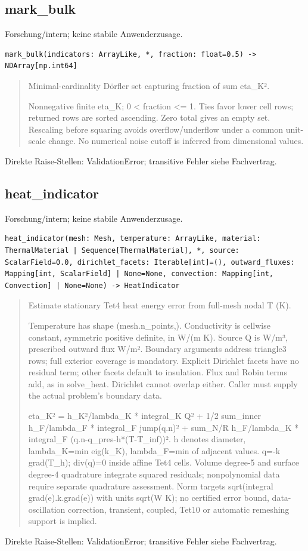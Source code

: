 \subsection{mark\_bulk}
Forschung/intern; keine stabile Anwenderzusage.
\begin{lstlisting}
mark_bulk(indicators: ArrayLike, *, fraction: float=0.5) -> NDArray[np.int64]
\end{lstlisting}
\begin{quote}
Minimal-cardinality Dörfler set capturing fraction of sum eta\_K².\par Nonnegative finite eta\_K; 0 < fraction <= 1. Ties favor lower cell rows; returned rows are sorted ascending. Zero total gives an empty set. Rescaling before squaring avoids overflow/underflow under a common unit-scale change. No numerical noise cutoff is inferred from dimensional values.
\end{quote}
Direkte Raise-Stellen: ValidationError; transitive Fehler siehe Fachvertrag.
\subsection{heat\_indicator}
Forschung/intern; keine stabile Anwenderzusage.
\begin{lstlisting}
heat_indicator(mesh: Mesh, temperature: ArrayLike, material: ThermalMaterial | Sequence[ThermalMaterial], *, source: ScalarField=0.0, dirichlet_facets: Iterable[int]=(), outward_fluxes: Mapping[int, ScalarField] | None=None, convection: Mapping[int, Convection] | None=None) -> HeatIndicator
\end{lstlisting}
\begin{quote}
Estimate stationary Tet4 heat energy error from full-mesh nodal T (K).\par Temperature has shape (mesh.n\_points,). Conductivity is cellwise constant, symmetric positive definite, in W/(m K). Source Q is W/m³, prescribed outward flux W/m². Boundary arguments address triangle3 rows; full exterior coverage is mandatory. Explicit Dirichlet facets have no residual term; other facets default to insulation. Flux and Robin terms add, as in solve\_heat. Dirichlet cannot overlap either. Caller must supply the actual problem's boundary data.\par eta\_K² = h\_K²/lambda\_K * integral\_K Q²   + 1/2 sum\_inner h\_F/lambda\_F * integral\_F jump(q.n)²   + sum\_N/R h\_F/lambda\_K * integral\_F (q.n-q\_pres-h*(T-T\_inf))². h denotes diameter, lambda\_K=min eig(k\_K), lambda\_F=min of adjacent values. q=-k grad(T\_h); div(q)=0 inside affine Tet4 cells. Volume degree-5 and surface degree-4 quadrature integrate squared residuals; nonpolynomial data require separate quadrature assessment. Norm targets sqrt(integral grad(e).k.grad(e)) with units sqrt(W K); no certified error bound, data-oscillation correction, transient, coupled, Tet10 or automatic remeshing support is implied.
\end{quote}
Direkte Raise-Stellen: ValidationError; transitive Fehler siehe Fachvertrag.
